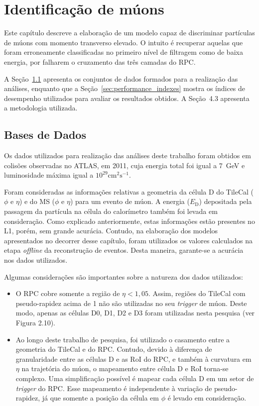 \chapter{Identificação de múons}

Este capítulo descreve a elaboração de um modelo capaz de discriminar partículas
de múons com momento transverso elevado. O intuito é recuperar aquelas que
foram erroneamente classificadas no primeiro nível de filtragem como de baixa
energia, por falharem o cruzamento das três camadas do RPC.

A Seção~\ref{sec:data-section} apresenta os conjuntos de dados formados para a
realização das análises, enquanto que a  Seção~\ref{sec:performance_indexes}
mostra os índices de desempenho utilizados para avaliar os resultados obtidos.
A Seção~4.3 apresenta a metodologia utilizada.

\section{Bases de Dados}
\label{sec:data-section}

Os dados utilizados para realização das análises deste trabalho foram obtidos em
colisões observadas no ATLAS, em 2011, cuja energia total foi igual a 7~GeV e
luminosidade máxima igual a $10^{29}\text{cm}^2\text{s}^{-1}$.

Foram consideradas as informações relativas a geometria da célula D do TileCal
($\phi$ e $\eta$) e do MS ($\phi$ e $\eta$) para um evento de múon.  A energia
($E_\text{D}$) depositada pela passagem da partícula na célula do calorímetro também
foi levada em consideração. Como explicado anteriormente, estas informações
estão presentes no L1, porém, sem grande acurácia.  Contudo, na elaboração dos
modelos apresentados no decorrer desse capítulo, foram utilizados os valores
calculados na etapa \emph{offline} da reconstrução de eventos. Desta maneira,
garante-se a acurácia nos dados utilizados.

Algumas considerações são importantes sobre a natureza dos dados utilizados:

\begin{itemize}

    \item O RPC cobre somente a região de $\eta < 1,05$. Assim, regiões do
    TileCal com pseudo-rapidez acima de 1 não são utilizadas no seu
    \emph{trigger} de múon.  Deste modo, apenas as células D0, D1, D2 e D3 foram
    utilizadas nesta pesquisa (ver Figura 2.10).

    \item Ao longo deste trabalho de pesquisa, foi utilizado o casamento entre a
    geometria do TileCal e do RPC. Contudo, devido à diferença de granularidade
    entre as células D e as RoI do RPC, e também à curvatura em $\eta$ na
    trajetória do múon, o mapeamento entre célula D e RoI torna-se complexo. Uma
    simplificação possível é mapear cada célula D em um setor de \emph{trigger}
    do RPC. Esse mapeamento é independente à variação de pseudo-rapidez, já que
    somente a posição da célula em $\phi$ é levado em consideração.

\end{itemize}

